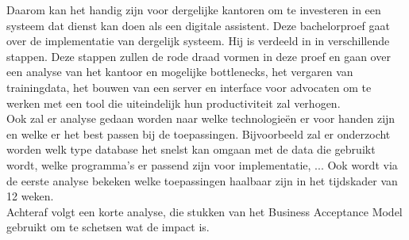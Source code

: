 Daarom kan het handig zijn voor dergelijke kantoren om te investeren in een systeem dat dienst kan doen als een digitale assistent. 
Deze bachelorproef gaat over de implementatie van dergelijk systeem. 
Hij is verdeeld in in verschillende stappen. 
Deze stappen zullen de rode draad vormen in deze proef en gaan over een analyse van het kantoor en mogelijke bottlenecks, het vergaren van trainingdata, het bouwen van een server en interface
voor advocaten om te werken met een tool die uiteindelijk hun productiviteit zal verhogen. \\  

Ook zal er analyse gedaan worden naar welke technologieën er voor handen zijn en welke er het best passen bij de toepassingen. 
Bijvoorbeeld zal er onderzocht worden welk type database het snelst kan omgaan met de data die gebruikt wordt, 
welke programma's er passend zijn voor implementatie, ... 
Ook wordt via de eerste analyse bekeken welke toepassingen haalbaar zijn in het tijdskader van 12 weken. \\

Achteraf volgt een korte analyse, die stukken van het Business Acceptance Model gebruikt om te schetsen wat de impact is.
